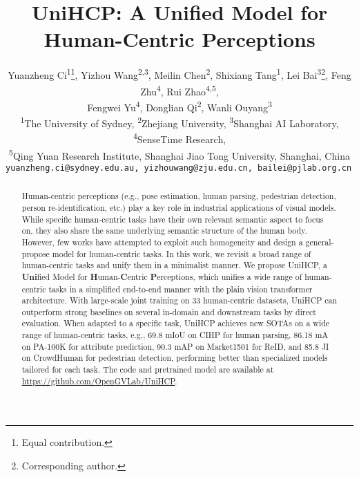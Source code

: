 \documentclass[10pt,twocolumn,letterpaper]{article}
\begin{document}
\title{UniHCP: A Unified Model for Human-Centric Perceptions} 

\author{Yuanzheng Ci\textsuperscript{1}\thanks{Equal contribution.}, Yizhou Wang\textsuperscript{2,3}\footnotemark[\value{footnote}], Meilin Chen\textsuperscript{2}, Shixiang Tang\textsuperscript{1}, Lei Bai\textsuperscript{3}\thanks{Corresponding author.},
Feng Zhu\textsuperscript{4}, Rui Zhao\textsuperscript{4,5}, \\Fengwei Yu\textsuperscript{4},
Donglian Qi\textsuperscript{2},
Wanli Ouyang\textsuperscript{3} \\
\textsuperscript{1}The University of Sydney,  \textsuperscript{2}Zhejiang University,  \textsuperscript{3}Shanghai AI Laboratory,  \textsuperscript{4}SenseTime Research,\\ \textsuperscript{5}Qing Yuan Research Institute, Shanghai Jiao Tong University, Shanghai, China \\
\tt\small yuanzheng.ci@sydney.edu.au, yizhouwang@zju.edu.cn, bailei@pjlab.org.cn
}


\maketitle


\begin{abstract}
    Human-centric perceptions (e.g., pose estimation, human parsing, pedestrian detection, person re-identification, etc.) play a key role in industrial applications of visual models. While specific human-centric tasks have their own relevant semantic aspect to focus on, they also share the same underlying semantic structure of the human body.  However, few works have attempted to exploit such homogeneity and design a general-propose model for human-centric tasks. 
    In this work, we revisit a broad range of human-centric tasks and unify them in a minimalist manner. We propose UniHCP, a \textbf{Uni}fied Model for \textbf{H}uman-\textbf{C}entric 
    \textbf{P}erceptions, which unifies a wide range of human-centric tasks in a simplified end-to-end manner with the plain vision transformer architecture. 
    With large-scale joint training on 33 human-centric datasets, 
UniHCP can outperform strong baselines on several in-domain and downstream tasks by direct evaluation.
When adapted to a specific task, UniHCP achieves new SOTAs on a wide range of human-centric tasks, e.g., 69.8 mIoU on CIHP for human parsing, 86.18 mA on PA-100K for attribute prediction, 90.3 mAP on Market1501 for ReID, and 85.8 JI on CrowdHuman for pedestrian detection,  performing better than specialized models tailored for each task. The code and pretrained model are available at \href{https://github.com/OpenGVLab/UniHCP}{https://github.com/OpenGVLab/UniHCP}.


\end{abstract}
\end{document}
